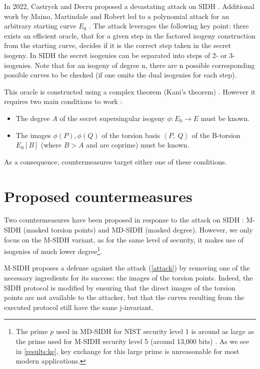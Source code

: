 \documentclass[a4paper,11pt,oneside]{report}
\begin{document}
    In 2022, Castryck and Decru proposed a devastating attack on SIDH \cite{attack}. Additional work by Maino, Martindale and Robert led to a polynomial attack for an arbitrary starting curve $E_0$ \cite{robert}. The attack leverages the following key point: there exists an efficient oracle, that for a given step in the factored isogeny construction from the starting curve, decides if it is the correct step taken in the secret isogeny. In SIDH the secret isogenies can be separated into steps of 2- or 3-isogenies. Note that for an isogeny of degree n, there are n possible corresponding possible curves to be checked (if one omits the dual isogenies for each step).
    
    This oracle is constructed using a complex theorem (Kani's theorem) \cite{attack}. However it requires two main conditions to work \cite{msidh}:
    \begin{itemize}
        \item The degree $A$ of the secret supersingular isogeny $\phi : E_0\rightarrow E$ must be known.
        \item The images $\phi (P), \phi (Q)$ of the torsion basis $\left \langle P,\: Q \right \rangle$ of the B-torsion $E_0 [B]$ (where $B > A$ and are coprime) must be known.
    \end{itemize}
    
    As a consequence, countermeasures target either one of these conditions.

\section{Proposed countermeasures}

    Two countermeasures have been proposed in response to the attack on SIDH \cite{msidh}: M-SIDH (masked torsion points) and MD-SIDH (masked degree). However, we only focus on the M-SIDH variant, as for the same level of security, it makes use of isogenies of much lower degree\footnote{The prime $p$ used in MD-SIDH for NIST security level 1 is around as large as the prime used for M-SIDH security level 5 (around 13,000 bits) \cite{msidh}. As we see in \autoref{results:ke}, key exchange for this large prime is unreasonable for most modern applications.}. 

    M-SIDH proposes a defense against the attack (\autoref{attack}) by removing one of the necessary ingredients for its success: the images of the torsion points. Indeed, the SIDH protocol is modified by ensuring that the direct images of the torsion points are not available to the attacker, but that the curves resulting from the executed protocol still have the same j-invariant.
\end{document}
